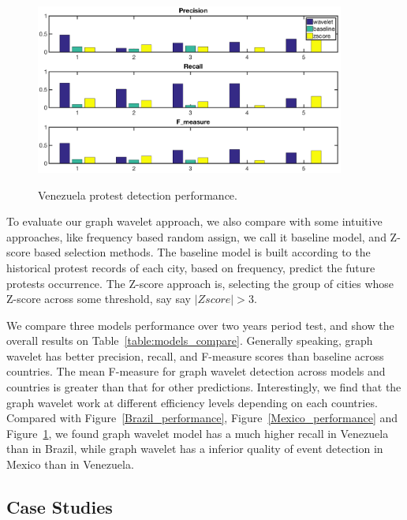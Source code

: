 \begin{figure}[h]
	\centering
    {
		\includegraphics[width= 4in] {figures/performance_compare_bar_graph_venezuela.png}
		\label{fig:distribution2}
	}
	\caption{Venezuela protest detection performance.}
	\label{Venezuela_performance}
\end{figure}


To evaluate our graph wavelet approach, we also compare with some intuitive approaches, like frequency based random assign, we call it baseline model, and Z-score based selection methods. The baseline model is built according to the historical protest records of each city, based on frequency, predict the future protests occurrence. The Z-score approach is, selecting the group of cities whose Z-score across some threshold, say say $|Zscore|>3$.

We compare three models performance over two years period test, and show the overall results on Table~\ref{table:models_compare}. Generally speaking, graph wavelet has better precision, recall, and F-measure scores than baseline across countries. The mean F-measure for graph wavelet detection across models and countries is greater than that for other predictions. Interestingly, we find that the graph wavelet work at different efficiency levels depending on each countries. Compared with Figure~\ref{Brazil_performance}, Figure~\ref{Mexico_performance} and Figure~\ref{Venezuela_performance}, we found graph wavelet model has a much higher recall in Venezuela than in Brazil, while graph wavelet has a inferior quality of event detection in Mexico than in Venezuela.



\subsection{Case Studies}
\label{sec:highlighted_results}

